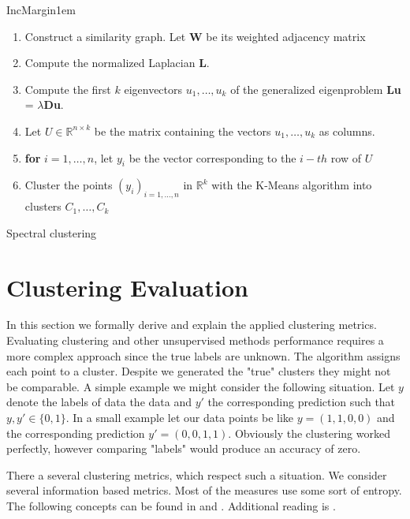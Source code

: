 \documentclass[12pt,a4paper,bibliography=totocnumbered,listof=totocnumbered]{scrartcl}
\begin{document}
{\begin{appendix}
IncMargin{1em}
\begin{algorithm}
	\BlankLine
	\begin{enumerate}
		\item Construct a similarity graph. Let \textbf{W} be its weighted adjacency matrix
		\item Compute the normalized Laplacian \textbf{L}.
		\item Compute the first $k$ eigenvectors $u_1,\dots,u_k$ of the generalized eigenproblem \textbf{Lu} = $\lambda$\textbf{Du}.
		\item Let $U \in \mathbb{R}^{n \times k}$ be the matrix containing the vectors $u_1,\dots,u_k$ as columns.
		\item \textbf{for} $i = 1,\dots,n$, let $y_i$ be the vector corresponding to the $i-th$ row of $U$
		\item Cluster the points $(y_i)_{i=1,\dots,n}$ in $\mathbb{R}^k$ with the K-Means algorithm into clusters $C_1,\dots,C_k$
	\end{enumerate}
	\caption{Spectral clustering}
	\label{alg:spec}
\end{algorithm}\DecMargin{1em}

\pagebreak

\section{Clustering Evaluation}
\label{sec:ce}
In this section we formally derive and explain the applied clustering metrics. Evaluating clustering and other unsupervised methods performance requires a more complex approach since the true labels are unknown. The algorithm assigns each point to a cluster. Despite we generated the "true" clusters they might not be comparable. A simple example we might consider the following situation. Let $y$ denote the labels of data the data and $y'$ the corresponding prediction such that  $y,y' \in \{0,1\}$. In a small example let our data points be like $y=(1,1,0,0)$ and the corresponding prediction $y'=(0,0,1,1)$. Obviously the clustering worked perfectly, however comparing "labels" would produce an accuracy of zero. 

There a several clustering metrics, which respect such a situation. We consider several information based metrics. Most of the measures use some sort of entropy. The following concepts can be found in \cite{Rosenberg2007} and  \cite{Vinh2010}. Additional reading is \cite{Hubert1985}. 


\end{appendix}}
\end{document}
